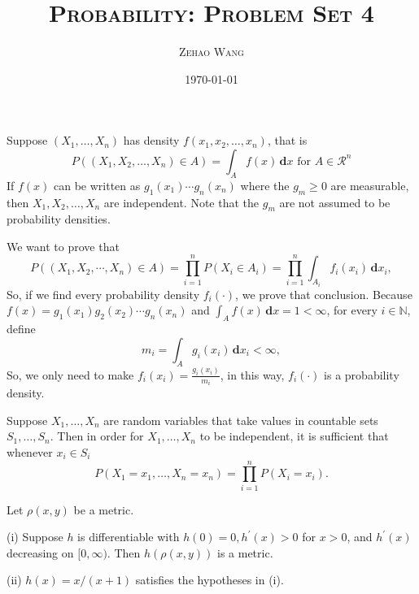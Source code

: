 \documentclass[en, normal, 11pt, black]{elegantnote}
\title{\textsc{Probability: Problem Set 4}}
\author{\textsc{Zehao Wang}}
\date{\today}
\newenvironment{exercise}[1]{\begin{tcolorbox}[colback=black!15, colframe=black!80, breakable, title=#1]}{\end{tcolorbox}}
\renewenvironment{proof}{\begin{tcolorbox}[colback=white, colframe=black!50, breakable, title=Proof. ]\setlength{\parskip}{0.8em}}{\,\\\rightline{$\square$}\end{tcolorbox}}
\newcommand{\der}{\,\mathbf{d}}
\begin{document}
    \maketitle

    \begin{exercise}{2.1.1}
        Suppose $\left(X_{1}, \ldots, X_{n}\right)$ has density $f\left(x_{1}, x_{2}, \ldots, x_{n}\right)$, that is
        \[
        P\left(\left(X_{1}, X_{2}, \ldots, X_{n}\right) \in A\right)=\int_{A} f(x) \der x \text { for } A \in \mathcal{R}^{n}
        \]
        If $f(x)$ can be written as $g_{1}\left(x_{1}\right) \cdots g_{n}\left(x_{n}\right)$ where the $g_{m} \geq 0$ are measurable, then $X_{1}, X_{2}, \ldots, X_{n}$ are independent. Note that the $g_{m}$ are not assumed to be probability densities. 
    \end{exercise}

    \begin{proof}
        We want to prove that 
        \[
            P((X_1,X_2,\cdots,X_n)\in A)=\prod_{i=1}^nP(X_i\in A_i)=\prod_{i=1}^n\int_{A_i}f_i(x_i) \der x_i, 
        \]
        So, if we find every probability density $f_i(\cdot)$, we prove that conclusion. Because $f(x)=g_1(x_1)g_2(x_2)\cdots g_n(x_n)$ and $\int_Af(x)\der x=1<\infty$, for every $i\in \mathbb{N}$, define 
        \[
            m_i=\int_A g_i(x_i) \der x_i<\infty, 
        \]
        So, we only need to make $f_i(x_i)=\frac{g_i(x_i)}{m_i}$, in this way, $f_i(\cdot)$ is a probability density. 
    \end{proof}

    \begin{exercise}{2.1.2}
         Suppose $X_{1}, \ldots, X_{n}$ are random variables that take values in countable sets $S_{1}, \ldots, S_{n} .$ Then in order for $X_{1}, \ldots, X_{n}$ to be independent, it is sufficient that whenever $x_{i} \in S_{i}$
         \[
             P\left(X_{1}=x_{1}, \ldots, X_{n}=x_{n}\right)=\prod_{i=1}^{n} P\left(X_{i}=x_{i}\right). 
         \]
    \end{exercise}

    \begin{exercise}{2.1.3}
        Let $\rho(x, y)$ be a metric. 
        
        (i) Suppose $h$ is differentiable with $h(0)=0, h^{\prime}(x)>0$ for $x>0$, and $h^{\prime}(x)$ decreasing on $[0, \infty)$. Then $h(\rho(x, y))$ is a metric. 
        
        (ii) $h(x)=x /(x+1)$ satisfies the hypotheses in (i). 
    \end{exercise}
\end{document}
